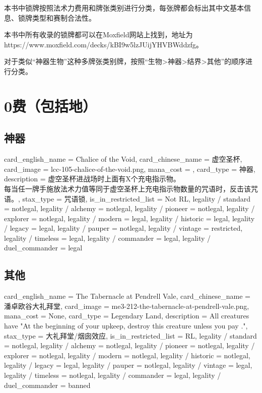 \documentclass[lang = cn, color = black, 10pt]{AllThatStax}
\begin{document}
本书中锁牌按照法术力费用和牌张类别进行分类，每张牌都会标出其中文基本信息、锁牌类型和赛制合法性。

本书中所有收录的锁牌都可以在Moxfield网站上找到，地址为https://www.moxfield.com/decks/kBI9w5lzJUijYHVBWddzfg。

对于类似“神器生物”这种多牌张类别牌，按照“生物>神器>结界>其他”的顺序进行分类。

\tableofcontents

\mainmatter

\chapter{0费（包括地）}

\section{神器}

\card
{
	card_english_name = {Chalice of the Void},
	card_chinese_name = {虚空圣杯},
	card_image = lcc-105-chalice-of-the-void.png,
	mana_cost = ,
	card_type = 神器,
	description = {虚空圣杯进战场时上面有X个充电指示物。\\
		每当任一牌手施放法术力值等同于虚空圣杯上充电指示物数量的咒语时，反击该咒语。},
	stax_type = 咒语锁,
	is_in_restricted_list = Not RL,
	legality / standard = notlegal,
	legality / alchemy = notlegal,
	legality / pioneer = notlegal,
	legality / explorer = notlegal,
	legality / modern = legal,
	legality / historic = legal,
	legality / legacy = legal,
	legality / pauper = notlegal,
	legality / vintage = restricted,
	legality / timeless = legal,
	legality / commander = legal,
	legality / duel_commander = legal
}

\section{其他}

\card
{
	card_english_name = {The Tabernacle at Pendrell Vale},
	card_chinese_name = {潘卓欧谷大礼拜堂},
	card_image = me3-212-the-tabernacle-at-pendrell-vale.png,
	mana_cost = None,
	card_type = Legendary Land,
	description = {All creatures have "At the beginning of your upkeep, destroy this creature unless you pay ."},
	stax_type = 大礼拜堂/烟囱效应,
	is_in_restricted_list = RL,
	legality / standard = notlegal,
	legality / alchemy = notlegal,
	legality / pioneer = notlegal,
	legality / explorer = notlegal,
	legality / modern = notlegal,
	legality / historic = notlegal,
	legality / legacy = legal,
	legality / pauper = notlegal,
	legality / vintage = legal,
	legality / timeless = notlegal,
	legality / commander = legal,
	legality / duel_commander = banned
}
\end{document}
